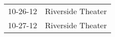 \begin{supertabular}{p{0.07\textwidth}p{0.23\textwidth}}
 10-26-12 &  Riverside Theater \\
 10-27-12 &  Riverside Theater \\
\end{supertabular}
